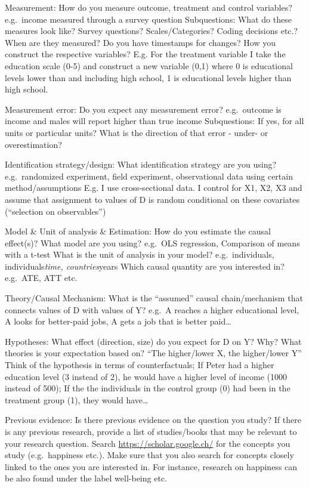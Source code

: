 \documentclass[
  12pt,
]{article}
\begin{document}
Measurement: How do you measure outcome, treatment and control variables?
e.g.~income measured through a survey question
Subquestions: What do these measures look like? Survey questions? Scales/Categories? Coding decisions etc.? When are they measured? Do you have timestamps for changes?
How you construct the respective variables?
E.g. For the treatment variable I take the education scale (0-5) and construct a new variable (0,1) where 0 is educational levels lower than and including high school, 1 is educational levels higher than high school.

Measurement error: Do you expect any measurement error?
e.g.~outcome is income and males will report higher than true income
Subquestions: If yes, for all units or particular units? What is the direction of that error - under- or overestimation?

Identification strategy/design: What identification strategy are you using?
e.g.~randomized experiment, field experiment, observational data using certain method/assumptions
E.g. I use cross-sectional data. I control for X1, X2, X3 and assume that assignment to values of D is random conditional on these covariates (``selection on observables'')

Model \& Unit of analysis \& Estimation:
How do you estimate the causal effect(s)? What model are you using?
e.g.~OLS regression, Comparison of means with a t-test
What is the unit of analysis in your model?
e.g.~individuals, individuals\emph{time, countries}years
Which causal quantity are you interested in?
e.g.~ATE, ATT etc.

Theory/Causal Mechanism: What is the ``assumed'' causal chain/mechanism that connects values of D with values of Y?
e.g.~A reaches a higher educational level, A looks for better-paid jobs, A gets a job that is better paid\ldots{}

Hypotheses: What effect (direction, size) do you expect for D on Y? Why? What theories is your expectation based on?
``The higher/lower X, the higher/lower Y''
Think of the hypothesis in terms of counterfactuals; If Peter had a higher education level (3 instead of 2), he would have a higher level of income (1000 instead of 500); If the the individuals in the control group (0) had been in the treatment group (1), they would have\ldots{}

Previous evidence: Is there previous evidence on the question you study?
If there is any previous research, provide a list of studies/books that may be relevant to your research question.
Search \url{https://scholar.google.ch/} for the concepts you study (e.g.~happiness etc.). Make sure that you also search for concepts closely linked to the ones you are interested in. For instance, research on happiness can be also found under the label well-being etc.
\end{document}
